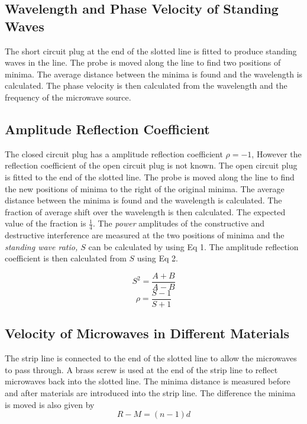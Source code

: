 \documentclass[12pt]{article}
\begin{document}
\subsection{Wavelength and Phase Velocity of Standing Waves}

The short circuit plug at the end of the slotted line is fitted to produce standing waves in the line. The probe is moved along the line to find two positions of minima. The average distance between the minima is found and the wavelength is calculated. The phase velocity is then calculated from the wavelength and the frequency of the microwave source.

\subsection{Amplitude Reflection Coefficient}

The closed circuit plug has a amplitude reflection coefficient $\rho = -1$, However the reflection coefficient of the open circuit plug is not known.
The open circuit plug is fitted to the end of the slotted line. The probe is moved along the line to find the new positions of minima to the right of the original minima.
The average distance between the minima is found and the wavelength is calculated. The fraction of average shift over the wavelength is then calculated. The expected value of the fraction is $\frac{1}{4}$.
The \textit{power} amplitudes of the constructive and destructive interference are measured at the two positions of minima and the \textit{standing wave ratio, $S$} can be calculated by using Eq 1.
The amplitude reflection coefficient is then calculated from $S$ using Eq 2.

\begin{equation}
    S^2 = \frac{A + B}{A - B}
    \label{eq:1}
\end{equation}
\begin{equation}
    \rho = \frac{S-1}{S+1}
    \label{eq:2}
\end{equation}

\subsection{Velocity of Microwaves in Different Materials}

The strip line is connected to the end of the slotted line to allow the microwaves to pass through.
A brass screw is used at the end of the strip line to reflect microwaves back into the slotted line.
The minima distance is measured before and after materials are introduced into the strip line.
The difference the minima is moved is also given by
\begin{equation}
    R - M = (n-1)d
    \label{eq:3}
\end{equation}
\end{document}
